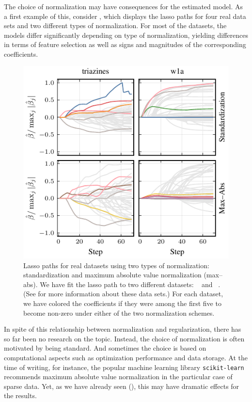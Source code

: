 The choice of normalization may have consequences for the estimated model. As a first
example of this, consider , which displays the lasso paths for
four real data sets and two different types of normalization. For most of the datasets, the
models differ significantly depending on type of normalization, yielding differences in
terms of feature selection as well as signs and magnitudes of the corresponding
coefficients.

\begin{figure}[bpt]
  \centering
  \includegraphics[]{plots/realdata_paths_small.pdf}
  \caption{%
    Lasso paths for real datasets using two types of normalization:
    standardization and maximum absolute value normalization (max--abs). We have fit
    the lasso path to two different datasets:
    ~\citep{king} and ~\citep{platt1998}. (See 
    for more information about these data sets.) For each
    dataset, we have colored the coefficients if they were among the first five
    to become non-zero under either of the two normalization schemes.
  }
  \label{fig:realdata-paths}
\end{figure}

In spite of this relationship between normalization and regularization, there has so far
been no research on the topic. Instead, the choice of normalization is often motivated by
being standard. And sometimes the choice is based on computational aspects such as
optimization performance and data storage. At the time of writing, for instance, the
popular machine learning library \texttt{scikit-learn}~\citep{scikit-learndevelopers2024}
recommends maximum absolute value normalization in the particular case of sparse data. Yet,
as we have already seen (), this may have dramatic effects for the
results.

